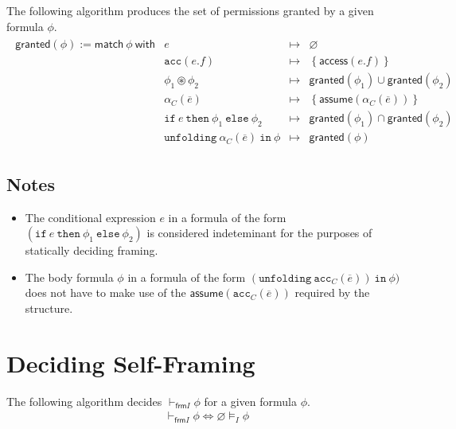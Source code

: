 \documentclass{article}
\newcommand{\tsf}{\textsf}
\newcommand{\ttt}{\texttt}
\newcommand{\access}{\tsf{access}}
\newcommand{\assume}{\tsf{assume}}
\newcommand{\frames}{\vDash_I}
\newcommand{\selfframes}{\vdash_{\tsf{frm}I}}
\newcommand{\mt}{\mapsto}
\newcommand{\set}[1]{\left\{ #1 \right\}}
\newcommand{\cast}{\circledast}
\renewcommand{\vec}{\overline}
\renewcommand{\empty}{\varnothing}
\newcommand{\cif}{\ttt{if}}
\newcommand{\cthen}{\ttt{then}}
\newcommand{\celse}{\ttt{else}}
\newcommand{\cacc}{\ttt{acc}}
\newcommand{\cunfolding}{\ttt{unfolding}}
\newcommand{\cin}{\ttt{in}}
\newcommand{\granted}{\tsf{granted}}
\begin{document}
\noindent
The following algorithm produces the set of permissions granted by a given formula $\phi$.
\begin{align*}
\begin{array}{r|lrl}
\granted(\phi)
:= \tsf{match} \ \phi \ \tsf{with}
%
%
& e                   &\mt& \empty \\
%
%
& \cacc(e.f)          &\mt& \set{ \access(e.f) }
\\
& \phi_1 \cast \phi_2 &\mt& \granted(\phi_1)
                      \cup  \granted(\phi_2)
\\
& \alpha_C(\vec{e})   &\mt& \set{ \assume(\alpha_C(\vec{e})) }
\\
& \cif \ e \ \cthen \ \phi_1 \ \celse \ \phi_2
                      &\mt& \granted(\phi_1) \cap \granted(\phi_2)
\\
& \cunfolding \ \alpha_C(\vec{e}) \ \cin \ \phi
                      &\mt& \granted(\phi)
\end{array}
\end{align*}

\subsection{Notes}

\begin{itemize}
\item The conditional expression $e$ in a formula of the form $(\cif \ e \ \cthen \ \phi_1 \ \celse \ \phi_2)$ is considered indeteminant for the purposes of statically deciding framing.

\item The body formula $\phi$ in a formula of the form $(\cunfolding \ \cacc_C(\vec{e})) \ \cin \ \phi)$ does not have to make use of the $\assume(\cacc_C(\vec{e}))$ required by the structure.
\end{itemize}

\newpage
\section{Deciding Self-Framing}

\noindent
The following algorithm decides $\selfframes \phi$ for a given formula $\phi$.
\begin{align*}
\selfframes \phi \iff \empty \frames \phi
\end{align*}

\end{document}
